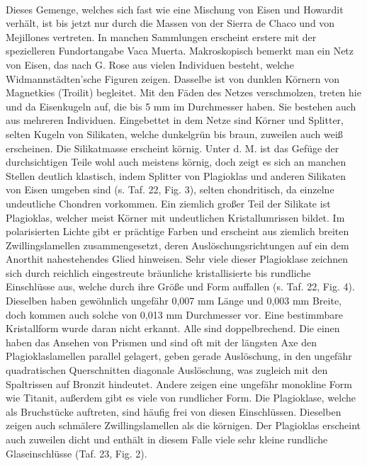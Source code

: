 \documentclass[a4paper, 12pt, oneside]{article}
\begin{document}
\paragraph{}
Dieses Gemenge, welches sich fast wie eine Mischung von Eisen und Howardit verhält, ist bis jetzt nur durch die Massen von der Sierra de Chaco und von Mejillones vertreten. In manchen Sammlungen erscheint erstere mit der spezielleren Fundortangabe Vaca Muerta. Makroskopisch bemerkt man ein Netz von Eisen, das nach G. Rose aus vielen Individuen besteht, welche Widmannstädten'sche Figuren zeigen. Dasselbe ist von dunklen Körnern von Magnetkies (Troilit) begleitet. Mit den Fäden des Netzes verschmolzen, treten hie und da Eisenkugeln auf, die bis 5 mm im Durchmesser haben. Sie bestehen auch aus mehreren Individuen. Eingebettet in dem Netze sind Körner und Splitter, selten Kugeln von Silikaten, welche dunkelgrün bis braun, zuweilen auch weiß erscheinen. Die Silikatmasse erscheint körnig. Unter d. M. ist das Gefüge der durchsichtigen Teile wohl auch meistens körnig, doch zeigt es sich an manchen Stellen deutlich klastisch, indem Splitter von Plagioklas und anderen Silikaten von Eisen umgeben sind (s. Taf. 22, Fig. 3), selten chondritisch, da einzelne undeutliche Chondren vorkommen. Ein ziemlich großer Teil der Silikate ist Plagioklas, welcher meist Körner mit undeutlichen Kristallumrissen bildet. Im polarisierten Lichte gibt er prächtige Farben und erscheint aus ziemlich breiten Zwillingslamellen zusammengesetzt, deren Auslöschungsrichtungen auf ein dem Anorthit nahestehendes Glied hinweisen. Sehr viele dieser Plagioklase zeichnen sich durch reichlich eingestreute bräunliche kristallisierte bis rundliche Einschlüsse aus, welche durch ihre Größe und Form auffallen (s. Taf. 22, Fig. 4). Dieselben haben gewöhnlich ungefähr 0,007 mm Länge und 0,003 mm Breite, doch kommen auch solche von 0,013 mm Durchmesser vor. Eine bestimmbare Kristallform wurde daran nicht erkannt. Alle sind doppelbrechend. Die einen haben das Ansehen von Prismen und sind oft mit der längsten Axe den Plagioklaslamellen parallel gelagert, geben gerade Auslöschung, in den ungefähr quadratischen Querschnitten diagonale Auslöschung, was zugleich mit den Spaltrissen auf Bronzit hindeutet. Andere zeigen eine ungefähr monokline Form wie Titanit, außerdem gibt es viele von rundlicher Form. Die Plagioklase, welche als Bruchstücke auftreten, sind häufig frei von diesen Einschlüssen. Dieselben zeigen auch schmälere Zwillingslamellen als die körnigen. Der Plagioklas erscheint auch zuweilen dicht und enthält in diesem Falle viele sehr kleine rundliche Glaseinschlüsse (Taf. 23, Fig. 2).
\end{document}
